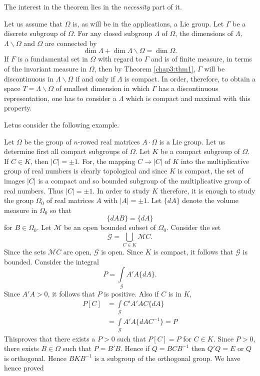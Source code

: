 The interest in the theorem lies in the {\em necessity} part of it.

Let us assume that $\Omega$ is, as will be in the applications, a Lie
group. Let $\Gamma$ be a discrete subgroup of $\Omega$. For any closed
subgroup $\Lambda$ of $\Omega$, the dimensions of $\Lambda$,
$\Lambda\backslash\Omega$ and $\Omega$ are connected by
$$
\dim\Lambda+\dim \Lambda\backslash\Omega=\dim\Omega. 
$$
If $F$ is a fundamental set in $\Omega$ with regard to $\Gamma$ and is
of finite measure, in terms of the invariant measure in $\Omega$, then
by Theorem \ref{chap3:thm1}, $\Gamma$ will be discontinuous in
$\Lambda\backslash\Omega$ if and only if $\Lambda$ is compact. In
order, therefore, to obtain a space $T=\Lambda\backslash\Omega$ of
smallest dimension in which $\Gamma$ has a discontinuous
representation, one has to consider a $\Lambda$ which is compact and
maximal with this property.

Let\pageoriginale us consider the following example.

Let $\Omega$ be the group of $n$-rowed real matrices $A\cdot\Omega$ is
a Lie group. Let us determine first all compact subgroups of
$\Omega$. Let $K$ be a compact subgroup of $\Omega$. If $C\in K$, then
$|C|=\pm 1$. For, the mapping $C\to|C|$ of $K$ into the multiplicative
group of real numbers is clearly topological and since $K$ is compact,
the set of images $|C|$ is a compact and so bounded subgroup of the
multiplicative group of real numbers. Thus $|C|=\pm 1$. In order to
study $K$ therefore, it is enough to study the group $\Omega_{0}$ of
real matrices $A$ with $|A|=\pm 1$. Let $\{dA\}$ denote the volume
measure in $\Omega_{0}$ so that
$$
\{dAB\}=\{dA\}
$$
for $B\in\Omega_{0}$. Let $\mathscr{M}$ be an open bounded subset of
$\Omega_{0}$. Consider the set
$$
\mathscr{G}=\bigcup_{C\in K}\mathscr{M}C.
$$
Since the sets $\mathscr{M}C$ are open, $\mathscr{G}$ is open. Since
$K$ is compact, it follows that $\mathscr{G}$ is bounded. Consider the
integral
$$
P=\int\limits_{\mathscr{G}}A'A\{dA\}.
$$
Since $A'A>0$, it follows that $P$ is positive. Also if $C$ is in $K$,
\begin{align*}
P[C] &= \int\limits_{\mathscr{G}}C'A'AC\{dA\}\\
&=\int\limits_{\mathscr{G}}A'A\{dAC^{-1}\}=P 
\end{align*}
This\pageoriginale proves that there exists a $P>0$ such that $P[C]=P$
for $C\in K$. Since $P>0$, there exists $B\in\Omega$ such that
$P=B'B$. Hence if $Q=BCB^{-1}$ then $Q'Q=E$ or $Q$ is
orthogonal. Hence $BKB^{-1}$ is a subgroup of the orthogonal group. We
have hence proved

